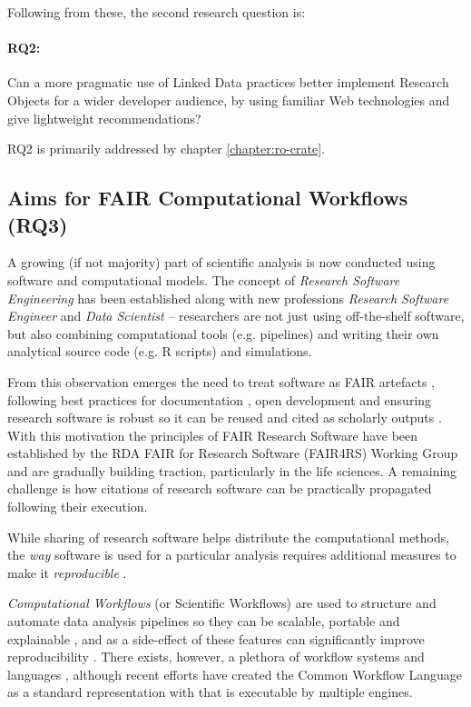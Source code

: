 Following from these, the second research question is: 

\paragraph{RQ2:}\label{rq2}  Can a more pragmatic use of Linked Data practices better implement Research Objects for a wider developer audience, by using familiar Web technologies and give lightweight recommendations?

RQ2 is primarily addressed by chapter \ref{chapter:ro-crate}.


\subsection{Aims for FAIR Computational Workflows (RQ3)}
\label{intro:rq3}

A growing (if not majority) part of scientific analysis is now conducted using software and computational models. The concept of \emph{Research Software Engineering} \cite{Cohen 2020} has been established along with new professions \emph{Research Software Engineer} \cite{Baxter 2012} and \emph{Data Scientist} \cite{van der Aalst 2014} -- researchers are not just using off-the-shelf software, but also combining computational tools (e.g. pipelines) and writing their own analytical source code (e.g. R scripts) and simulations.

From this observation emerges the need to treat software as FAIR artefacts \cite{Lamprecht 2019}, following best practices for documentation \cite{Lee 2018}, open development \cite{Prlić 2012} and ensuring research software is robust \cite{Taschuk 2017} so it can be reused and cited as scholarly outputs \cite{Smith 2016}. 
With this motivation the principles of FAIR Research Software \cite{Katz 2021b} have been established by the RDA FAIR for Research Software (FAIR4RS) Working Group \cite{Barker 2022} and are gradually building traction, particularly in the life sciences. A remaining challenge is how citations of research software can be practically propagated following their execution. 

While sharing of research software helps distribute the computational methods, the \emph{way} software is used for a particular analysis requires additional measures to make it \emph{reproducible} \cite{Stodden 2016,Sandve 2013}.

\emph{Computational Workflows} (or Scientific Workflows) are used to structure and automate data analysis pipelines so they can be scalable, portable and explainable \cite{Atkinson 2017}, and as a side-effect of these features can significantly improve reproducibility \cite{Cohen-Boulakia 2017}. 
There exists, however, a plethora of workflow systems and languages \cite{Leipzig 2021,Amstutz 2021}, although recent efforts have created the Common Workflow Language \cite{Crusoe 2022} as a standard representation with  that is executable by multiple engines. 

